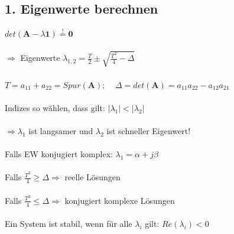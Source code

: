 \documentclass[a4paper,twocolumn,10pt]{article}
\newcommand{\sollsein}{\stackrel{!}{=}}
\begin{document}
\subsection*{1. Eigenwerte berechnen}
$det(\textbf{A}-\lambda \textbf{1})\sollsein \textbf{0}$\\\\
$\Rightarrow$ Eigenwerte $\lambda_{1,2}=\frac{T}{2}\pm \sqrt{\frac{T^2}{4}-\Delta}$\\\\
$T=a_{11}+a_{22}=Spur(\textbf{A});\;\;\;\;\Delta =det(\textbf{A})=a_{11}a_{22}-a_{12}a_{21}$\\\\
Indizes so wählen, dass gilt: $|\lambda_1|<|\lambda_2|$\\\\
$\Rightarrow \lambda_1$ ist langsamer und $\lambda_2$ ist schneller Eigenwert!\\\\
Falls EW konjugiert komplex: $\lambda_1=\alpha +j\beta$\\\\
Falls $\frac{T^2}{4}\ge \Delta \Rightarrow$ reelle Lösungen\\\\
Falls $\frac{T^2}{4}\le \Delta \Rightarrow$ konjugiert komplexe Lösungen\\\\
Ein System ist stabil, wenn für alle $\lambda_i$ gilt: $Re(\lambda_i)<0$
\end{document}
